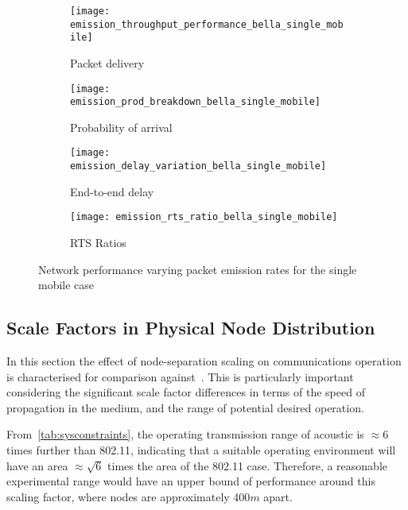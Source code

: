 \begin{figure}[bp!]
	\begin{subfigure}[t]{0.5\textwidth}
		\centering
		\texttt{[image: emission\_throughput\_performance\_bella\_single\_mobile]}
		\caption{Packet delivery}
		\label{fig:emission_throughput_performance_bella_single_mobile}
	\end{subfigure}
	\begin{subfigure}[t]{0.5\textwidth}
		\centering
		\texttt{[image: emission\_prod\_breakdown\_bella\_single\_mobile]}
		\caption{Probability of arrival}
		\label{fig:emission_prod_breakdown_bella_single_mobile}
	\end{subfigure}
	
	\begin{subfigure}[t]{0.5\textwidth}
		\centering
		\texttt{[image: emission\_delay\_variation\_bella\_single\_mobile]}
		\caption{End-to-end delay}
		\label{fig:emission_delay_variation_bella_single_mobile}
	\end{subfigure}
	\begin{subfigure}[t]{0.5\textwidth}
		\centering
		\texttt{[image: emission\_rts\_ratio\_bella\_single\_mobile]}
		\caption{RTS Ratios}
		\label{fig:emission_rts_ratio_bella_single_mobile}
	\end{subfigure}
	\caption{Network performance varying packet emission rates for the single mobile case}
	\label{fig:emission_bella_single_mobile}
\end{figure}

\clearpage

\subsection{Scale Factors in Physical Node Distribution}

In this section the effect of node-separation scaling on communications operation is characterised for comparison against~\cite{Guo11}. 
This is particularly important considering the significant scale factor differences in terms of the speed of propagation in the medium, and the range of potential desired operation.

From~\autoref{tab:sysconstraints}, the operating transmission range of acoustic is $\approx 6$ times further than 802.11, indicating that a suitable operating environment will have an area $\approx \sqrt{6}$ times the area of the 802.11 case. Therefore, a reasonable experimental range would have an upper bound of performance around this scaling factor, where nodes are approximately 400$m$ apart. 


